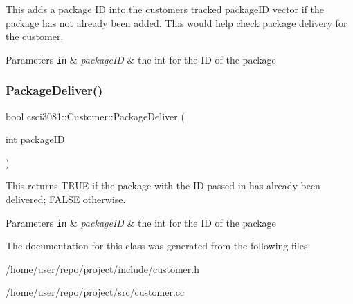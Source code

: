 This adds a package ID into the customer\textquotesingle{}s tracked package\+ID vector if the package has not already been added. This would help check package delivery for the customer. 


\begin{DoxyParams}[1]{Parameters}
\mbox{\tt in}  & {\em package\+ID} & the int for the ID of the package \\
\hline
\end{DoxyParams}
\mbox{\label{classcsci3081_1_1Customer_a0277fdbb1cdb28f8932f69ead7eadf9f}} 
\subsubsection{\texorpdfstring{Package\+Deliver()}{PackageDeliver()}}
{\footnotesize\ttfamily bool csci3081\+::\+Customer\+::\+Package\+Deliver (\begin{DoxyParamCaption}\item[{int}]{package\+ID }\end{DoxyParamCaption})}



This returns T\+R\+UE if the package with the ID passed in has already been delivered; F\+A\+L\+SE otherwise. 


\begin{DoxyParams}[1]{Parameters}
\mbox{\tt in}  & {\em package\+ID} & the int for the ID of the package \\
\hline
\end{DoxyParams}


The documentation for this class was generated from the following files\+:\begin{DoxyCompactItemize}
\item 
/home/user/repo/project/include/customer.\+h\item 
/home/user/repo/project/src/customer.\+cc\end{DoxyCompactItemize}
